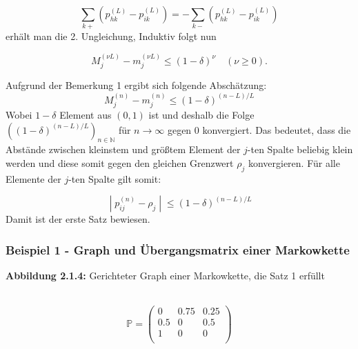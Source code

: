 \documentclass[a4paper]{article}
\begin{document}
\[
\sum_{k+} \left(
	p_{hk} ^{(L)} - p_{ik} ^{(L)}
\right) 
=
-
\sum_{k-} \left(
	p_{hk} ^{(L)} - p_{ik} ^{(L)}
\right) 
\] 
erhält man die 2. Ungleichung,
Induktiv folgt nun

\[
M_j ^{(\nu L)} - m_j ^{(\nu L)}
\leq \left(
	1 - \delta
\right) ^{\nu} \quad (\nu \geq 0) .
\] 

Aufgrund der Bemerkung 1 ergibt sich folgende Abschätzung:
\[
	M_j ^{(n)} - m_j ^{(n)} \leq \left(
		1 - \delta
	\right) ^{(n-L) / L}
\]
Wobei $1- \delta$ Element aus $(0,1)$ ist und deshalb die Folge 
$\left(
	(1 - \delta) ^{(n-L) / L}
\right) _{n \in \mathbb{N}} $
für $n \rightarrow \infty$ gegen $0$
konvergiert. Das bedeutet, dass die Abstände zwischen kleinstem und größtem Element der $j$-ten
Spalte beliebig klein werden und diese somit gegen den gleichen Grenzwert $\rho_j$ konvergieren. Für
alle Elemente der $j$-ten Spalte gilt somit:

\[
	\; | \; p_{ij} ^{(n)} - \rho_j \; | \; \leq (1 - \delta) ^{(n-L) / L}
\]
Damit ist der erste Satz bewiesen.

\subsubsection{Beispiel 1 - Graph und Übergangsmatrix einer Markowkette}

\begin{center}
\end{center}
\qquad \caption{\textbf{Abbildung 2.1.4:} Gerichteter Graph einer Markowkette, die Satz 1 erfüllt}
\\

\[
	\mathbb{P} = \begin{pmatrix} 
		0 & 0.75 & 0.25 \\
		0.5 & 0 & 0.5 \\
		1 & 0 & 0 \\
	\end{pmatrix} 
\]
\end{document}
